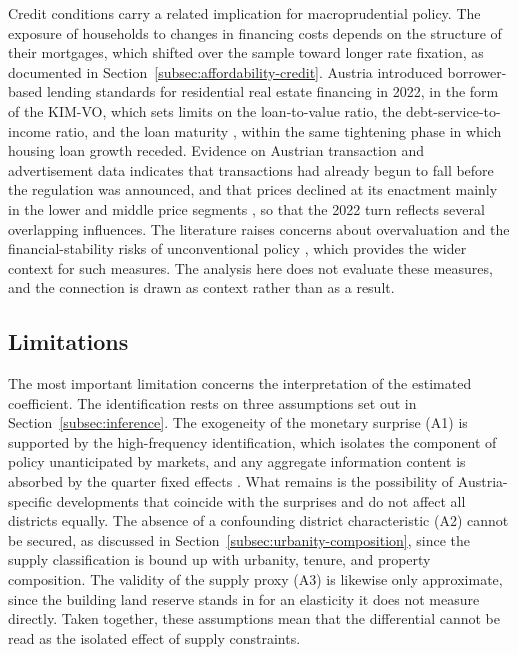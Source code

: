 \documentclass[a4paper,12pt, headsepline]{scrartcl}
\numberwithin{equation}{section}
\begin{document}
Credit conditions carry a related implication for macroprudential policy. The exposure of households to changes in financing costs depends on the structure of their mortgages, which shifted over the sample toward longer rate fixation, as documented in Section~\ref{subsec:affordability-credit}. Austria introduced borrower-based lending standards for residential real estate financing in 2022, in the form of the KIM-VO, which sets limits on the loan-to-value ratio, the debt-service-to-income ratio, and the loan maturity \citep{fma2022}, within the same tightening phase in which housing loan growth receded. Evidence on Austrian transaction and advertisement data indicates that transactions had already begun to fall before the regulation was announced, and that prices declined at its enactment mainly in the lower and middle price segments \citep{hahn2025}, so that the 2022 turn reflects several overlapping influences. The literature raises concerns about overvaluation and the financial-stability risks of unconventional policy \citep{biljanovska2025, berg2024}, which provides the wider context for such measures. The analysis here does not evaluate these measures, and the connection is drawn as context rather than as a result.

\subsection{Limitations}\label{subsec:limitations}

The most important limitation concerns the interpretation of the estimated coefficient. The identification rests on three assumptions set out in Section~\ref{subsec:inference}. The exogeneity of the monetary surprise (A1) is supported by the high-frequency identification, which isolates the component of policy unanticipated by markets, and any aggregate information content is absorbed by the quarter fixed effects \citep{altavilla2019, jarocinski2020}. What remains is the possibility of Austria-specific developments that coincide with the surprises and do not affect all districts equally. The absence of a confounding district characteristic (A2) cannot be secured, as discussed in Section~\ref{subsec:urbanity-composition}, since the supply classification is bound up with urbanity, tenure, and property composition. The validity of the supply proxy (A3) is likewise only approximate, since the building land reserve stands in for an elasticity it does not measure directly. Taken together, these assumptions mean that the differential cannot be read as the isolated effect of supply constraints.
\end{document}
